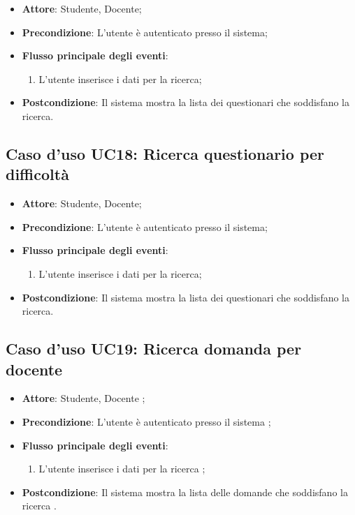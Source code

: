 \documentclass[12pt,a4paper]{article}
\begin{document}
\begin{itemize}

\item \textbf{Attore}: Studente, Docente; 
\item \textbf{Precondizione}: L'utente è autenticato presso il sistema;

\item \textbf{Flusso principale degli eventi}:
\begin{enumerate}
	\item L'utente inserisce i dati per la ricerca;
	
\end{enumerate}
\item \textbf{Postcondizione}: Il sistema mostra la lista dei questionari che soddisfano la ricerca.
\end{itemize}
\hypertarget{UC18}{}
\subsection{Caso d'uso UC18: Ricerca questionario per difficoltà}

\begin{itemize}

\item \textbf{Attore}: Studente, Docente; 
\item \textbf{Precondizione}: L'utente è autenticato presso il sistema;

\item \textbf{Flusso principale degli eventi}:
\begin{enumerate}
	\item L'utente inserisce i dati per la ricerca;
	
\end{enumerate}
\item \textbf{Postcondizione}: Il sistema mostra la lista dei questionari che soddisfano la ricerca.
\end{itemize}
\hypertarget{UC19}{}
\subsection{Caso d'uso UC19: Ricerca domanda per docente}

\begin{itemize}

\item \textbf{Attore}: Studente, Docente
; 
\item \textbf{Precondizione}: L'utente è autenticato presso il sistema
;

\item \textbf{Flusso principale degli eventi}:
\begin{enumerate}
	\item L'utente inserisce i dati per la ricerca	;
	
\end{enumerate}
\item \textbf{Postcondizione}: Il sistema mostra la lista delle domande che soddisfano la ricerca
.
\end{itemize}
\hypertarget{UC20}{}
\end{document}
